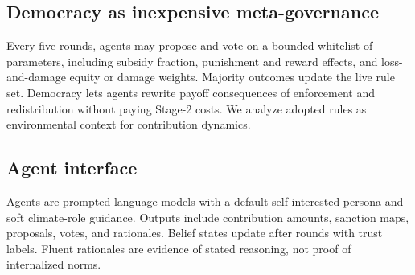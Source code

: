 \subsection{Democracy as inexpensive meta-governance}

Every five rounds, agents may propose and vote on a bounded whitelist of parameters, including subsidy fraction, punishment and reward effects, and loss-and-damage equity or damage weights.
Majority outcomes update the live rule set.
Democracy lets agents rewrite payoff consequences of enforcement and redistribution without paying Stage-2 costs.
We analyze adopted rules as environmental context for contribution dynamics.

\subsection{Agent interface}

Agents are prompted language models with a default self-interested persona and soft climate-role guidance.
Outputs include contribution amounts, sanction maps, proposals, votes, and rationales.
Belief states update after rounds with trust labels.
Fluent rationales are evidence of stated reasoning, not proof of internalized norms.
